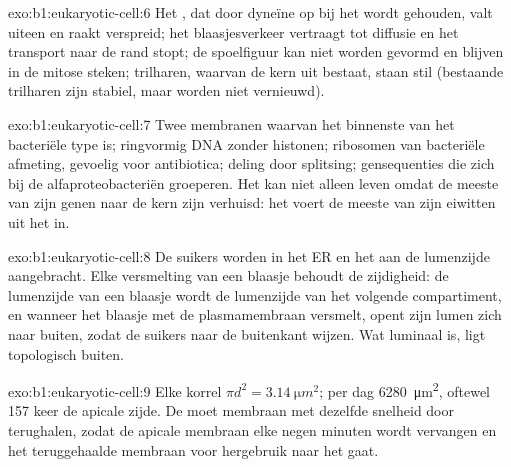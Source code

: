 \begin{solution}{exo:b1:eukaryotic-cell:6}
Het , dat door dyneïne op  bij het  wordt
gehouden, valt uiteen en raakt verspreid; het blaasjesverkeer vertraagt tot
diffusie en het transport naar de rand stopt; de spoelfiguur kan niet worden
gevormd en  blijven in de mitose steken; trilharen, waarvan de kern uit
 bestaat, staan stil (bestaande trilharen zijn stabiel, maar worden
niet vernieuwd).
\end{solution}

\begin{solution}{exo:b1:eukaryotic-cell:7}
Twee membranen waarvan het binnenste van het bacteriële type is; ringvormig DNA
zonder histonen; ribosomen van bacteriële afmeting, gevoelig voor antibiotica;
deling door splitsing; gensequenties die zich bij de alfaproteobacteriën
groeperen. Het kan niet alleen leven omdat de meeste van zijn genen naar de kern
zijn verhuisd: het voert de meeste van zijn eiwitten uit het  in.
\end{solution}

\begin{solution}{exo:b1:eukaryotic-cell:8}
De suikers worden in het ER en het  aan de lumenzijde aangebracht.
Elke versmelting van een blaasje behoudt de zijdigheid: de lumenzijde van een
blaasje wordt de lumenzijde van het volgende compartiment, en wanneer het blaasje
met de plasmamembraan versmelt, opent zijn lumen zich naar buiten, zodat de
suikers naar de buitenkant wijzen. Wat luminaal is, ligt topologisch buiten.
\end{solution}

\begin{solution}{exo:b1:eukaryotic-cell:9}
Elke korrel $\pi d^2 = \qty{3.14}{\micro m^2}$; per dag
\qty{6280}{\micro m^2}, oftewel \qty{157}{} keer de apicale zijde. De  moet
membraan met dezelfde snelheid door  terughalen, zodat de apicale
membraan elke negen minuten wordt vervangen en het teruggehaalde membraan voor
hergebruik naar het  gaat.
\end{solution}

